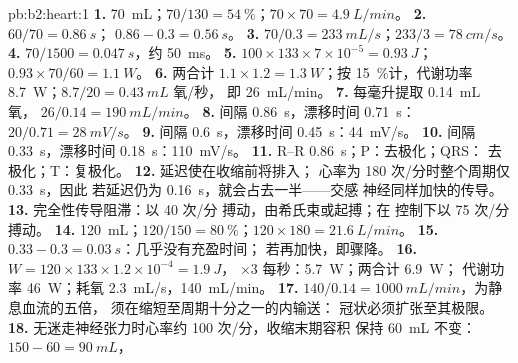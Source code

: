 \begin{solution}{pb:b2:heart:1}
\textbf{1.} \qty{70}{mL}；$70/130 = \qty{54}{\%}$；$70\times 70 =
\qty{4.9}{L/min}$。
\textbf{2.} $60/70 = \qty{0.86}{s}$； $0.86 - 0.3 =
\qty{0.56}{s}$。
\textbf{3.} $70/0.3 = \qty{233}{mL/s}$；$233/3 = \qty{78}{cm/s}$。
\textbf{4.} $70/1500 = \qty{0.047}{s}$，约 \qty{50}{ms}。
\textbf{5.} $100\times 133\times 7\times 10^{-5} = \qty{0.93}{J}$；
$0.93\times 70/60 = \qty{1.1}{W}$。
\textbf{6.} 两合计 $1.1\times 1.2 = \qty{1.3}{W}$；按
\qty{15}{\%}计，代谢功率 \qty{8.7}{W}；$8.7/20 = \qty{0.43}{mL}$ 氧/秒，
即 \qty{26}{mL/min}。
\textbf{7.} 每毫升提取 \qty{0.14}{mL} 氧，
$26/0.14 = \qty{190}{mL/min}$。
\textbf{8.} 间隔 \qty{0.86}{s}，漂移时间 \qty{0.71}{s}：
$20/0.71 = \qty{28}{mV/s}$。
\textbf{9.} 间隔 \qty{0.6}{s}，漂移时间 \qty{0.45}{s}：\qty{44}{mV/s}。
\textbf{10.} 间隔 \qty{0.33}{s}，漂移时间 \qty{0.18}{s}：\qty{110}{mV/s}。
\textbf{11.} R--R \qty{0.86}{s}；P：去极化；QRS：
去极化；T：复极化。
\textbf{12.} 延迟使在收缩前将排入；
心率为 180 次/分时整个周期仅 \qty{0.33}{s}，因此
若延迟仍为 \qty{0.16}{s}，就会占去一半——交感
神经同样加快的传导。
\textbf{13.} 完全性传导阻滞：以 40 次/分
搏动，由希氏束或起搏；在
控制下以 75 次/分搏动。
\textbf{14.} \qty{120}{mL}；$120/150 = \qty{80}{\%}$；$120\times 180 =
\qty{21.6}{L/min}$。
\textbf{15.} $0.33 - 0.3 = \qty{0.03}{s}$：几乎没有充盈时间；
若再加快，即骤降。
\textbf{16.} $W = 120\times 133\times 1.2\times 10^{-4} = \qty{1.9}{J}$，
$\times 3$ 每秒：\qty{5.7}{W}；两合计 \qty{6.9}{W}；
代谢功率 \qty{46}{W}；耗氧 \qty{2.3}{mL/s}，\qty{140}{mL/min}。
\textbf{17.} $140/0.14 = \qty{1000}{mL/min}$，为静息血流的五倍，
须在缩短至周期十分之一的内输送：
冠状必须扩张至其极限。
\textbf{18.} 无迷走神经张力时心率约 100 次/分，收缩末期容积
保持 \qty{60}{mL} 不变： $150 - 60 = \qty{90}{mL}$，

\end{solution}
